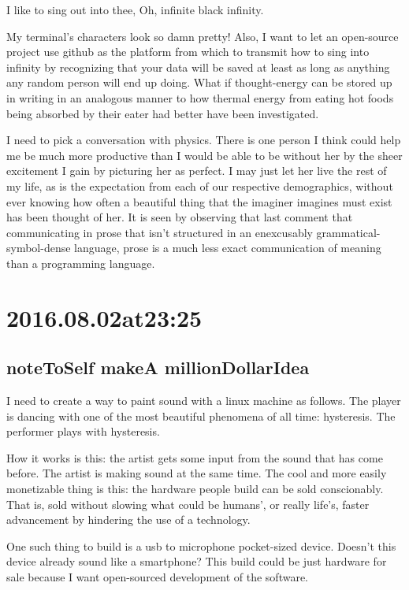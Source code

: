\begin{enumerate}
\begin{enumerate}
I like to sing out into thee,
Oh, infinite black infinity.

My terminal's characters look so damn pretty! Also, I want to let an open-source project use github as the platform from which to transmit how to sing into infinity by recognizing that your data will be saved at least as long as anything any random person will end up doing. What if thought-energy can be stored up in writing in an analogous manner to how thermal energy from eating hot foods being absorbed by their eater had better have been investigated.

I need to pick a conversation with physics. There is one person I think could help me be much more productive than I would be able to be without her by the sheer excitement I gain by picturing her as perfect. I may just let her live the rest of my life, as is the expectation from each of our respective demographics, without ever knowing how often a beautiful thing that the imaginer imagines must exist has been thought of her. It is seen by observing that last comment that communicating in prose that isn't structured in an enexcusably grammatical-symbol-dense language, prose is a much less exact communication of meaning than a programming language.

\section*{ 2016.08.02at23:25 }
\subsection*{ noteToSelf makeA millionDollarIdea }
I need to create a way to paint sound with a linux machine as follows. The player is dancing with one of the most beautiful phenomena of all time: hysteresis. The performer plays with hysteresis.

How it works is this: the artist gets some input from the sound that has come before. The artist is making sound at the same time. The cool and more easily monetizable thing is this: the hardware people build can be sold conscionably. That is, sold without slowing what could be humans', or really life's, faster advancement by hindering the use of a technology.

One such thing to build is a usb to microphone pocket-sized device. Doesn't this device already sound like a smartphone? This build could be just hardware for sale because I want open-sourced development of the software.


\end{enumerate}
\end{enumerate}
